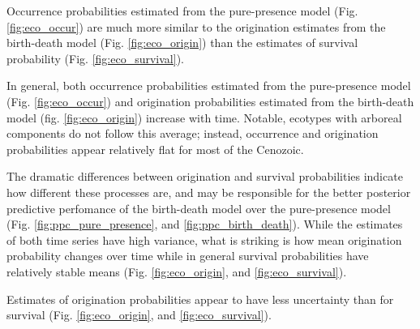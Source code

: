 \documentclass[12pt,letterpaper]{article}
\begin{document}

Occurrence probabilities estimated from the pure-presence model (Fig. \ref{fig:eco_occur}) are much more similar to the origination estimates from the birth-death model (Fig. \ref{fig:eco_origin}) than the estimates of survival probability (Fig. \ref{fig:eco_survival}). 

In general, both occurrence probabilities estimated from the pure-presence model (Fig. \ref{fig:eco_occur}) and origination probabilities estimated from the birth-death model (fig. \ref{fig:eco_origin}) increase with time. Notable, ecotypes with arboreal components do not follow this average; instead, occurrence and origination probabilities appear relatively flat for most of the Cenozoic.

The dramatic differences between origination and survival probabilities indicate how different these processes are, and may be responsible for the better posterior predictive perfomance of the birth-death model over the pure-presence model (Fig. \ref{fig:ppc_pure_presence}, and \ref{fig:ppc_birth_death}). While the estimates of both time series have high variance, what is striking is how mean origination probability changes over time while in general survival probabilities have relatively stable means (Fig. \ref{fig:eco_origin}, and \ref{fig:eco_survival}).

Estimates of origination probabilities appear to have less uncertainty than for survival (Fig. \ref{fig:eco_origin}, and \ref{fig:eco_survival}).
\end{document}
